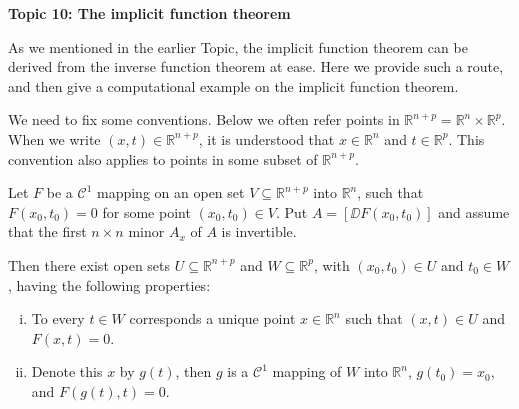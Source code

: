 \documentclass[11pt]{article}
\begin{document}
\begin{center}
  \textbf{Topic 10: The implicit function theorem}
\end{center}

As we mentioned in the earlier Topic, the implicit function theorem can be derived from the inverse function theorem at ease.
Here we provide such a route, and then give a computational example on the implicit function theorem.

We need to fix some conventions.
Below we often refer points in $\mathbb{R}^{n+p} = \mathbb{R}^n \times \mathbb{R}^p$.
When we write $(x, t) \in \mathbb{R}^{n+p}$, it is understood that $x \in \mathbb{R}^n$ and $t \in \mathbb{R}^p$.
This convention also applies to points in some subset of $\mathbb{R}^{n+p}$.

\begin{thm}
  Let $F$ be a $\mathcal{C}^1$ mapping on an open set $V \subseteq \mathbb{R}^{n+p}$ into $\mathbb{R}^n$, such that $F(x_0, t_0) = 0$ for some point $(x_0, t_0) \in V$.
  Put $A = [\DD F(x_0, t_0)]$ and assume that the first $n \times n$ minor $A_x$ of $A$ is invertible.

  Then there exist open sets $U \subseteq \mathbb{R}^{n+p}$ and $W \subseteq \mathbb{R}^p$, with $(x_0, t_0) \in U$ and $t_0 \in W$, having the following properties:
  \begin{enumerate}[(i)]
    \item To every $t \in W$ corresponds a unique point $x \in \mathbb{R}^n$ such that $(x,t) \in U$ and $F(x,t) = 0$.
    \item Denote this $x$ by $g(t)$, then $g$ is a $\mathcal{C}^1$ mapping of $W$ into $\mathbb{R}^n$, $g(t_0) = x_0$, and $F\left( g(t), t \right) = 0$.
  \end{enumerate}
\end{thm}
\end{document}
